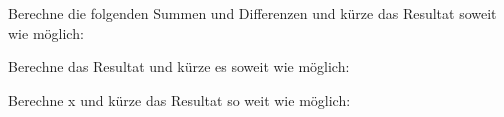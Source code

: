 \documentclass[12pt]{exam}
\begin{document}
\begin{questions}
\newpage
\question[6]
Berechne die folgenden Summen und Differenzen und kürze das Resultat soweit wie möglich:
\vspace{15pt}

\newpage
\question[6]
Berechne das Resultat und kürze es soweit wie möglich:
\vspace{15pt}

\newpage
\question[6]
Berechne x und kürze das Resultat so weit wie möglich:
\vspace{15pt}

\addpoints
\end{questions}
\end{document}
